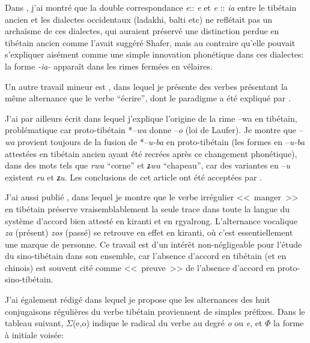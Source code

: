 \documentclass[oldfontcommands,oneside,a4paper,11pt]{memoir}
\newcommand{\sig}{\begin{math}\Sigma\end{math}}
\newcommand{\phone}{\begin{math}\Phi\end{math}}
\begin{document}
Dans \citet{jacques09e}, j'ai montré que la double correspondance \textit{e}:: \textit{e} et \textit{e} :: \textit{ia} entre le tibétain ancien et les dialectes occidentaux (ladakhi, balti etc) ne reflétait pas un archaïsme de ces dialectes, qui auraient préservé une distinction perdue en tibétain ancien comme l'avait suggéré Shafer, mais au contraire qu'elle pouvait s'expliquer aisément comme une simple innovation phonétique dans ces dialectes: la forme \textit{-ia-} apparaît dans les rimes fermées en vélaires.

Un autre travail mineur est \citet{jacques10ndr}, dans lequel je présente des verbes présentant la même alternance que le verbe ``écrire'', dont le paradigme a été expliqué par \citet{hill05vbri}.

J'ai par ailleurs écrit \citet{jacques09wazur} dans lequel j'explique l'origine de la rime --wa en tibétain, problématique car proto-tibétain *--\textit{wa} donne --\textit{o} (loi de Laufer). Je montre que --\textit{wa} provient toujours de la fusion de *--\textit{u-ba} en proto-tibétain (les formes en --\textit{u-ba} attestées en tibétain ancien ayant été recrées après ce changement phonétique), dans des mots tels que \textit{rwa} ``corne'' et \textit{ʑwa} ``chapeau'', car des variantes en --\textit{u} existent \textit{ru} et \textit{ʑu}. Les conclusions de cet article ont été acceptées par \citealt{hill11laws}.

J'ai aussi publié \citet{jacques10zos}, dans lequel je montre que le verbe irrégulier <<~manger~>> en tibétain préserve vraisemblablement la seule trace dans toute la langue du système d'accord bien attesté en kiranti et en rgyalrong. L'alternance vocalique \textit{za} (présent) \textit{zos} (passé) se retrouve en effet en kiranti, où c'est essentiellement une marque de personne.
Ce travail est d'un intérêt non-négligeable pour l'étude du sino-tibétain dans son ensemble, car l'absence d'accord en tibétain (et en chinois) est souvent cité comme <<~preuve~>> de l'absence d'accord en proto-sino-tibétain.

J'ai également rédigé \citet{jacques12internal} dans lequel je propose que les alternances des huit conjugaisons régulières du verbe tibétain proviennent de simples préfixes. Dans le tableau suivant, \sig{}(e,o) indique le radical du verbe au degré \textit{o} ou \textit{e}, et \phone{} la forme à initiale voisée:
\end{document}
